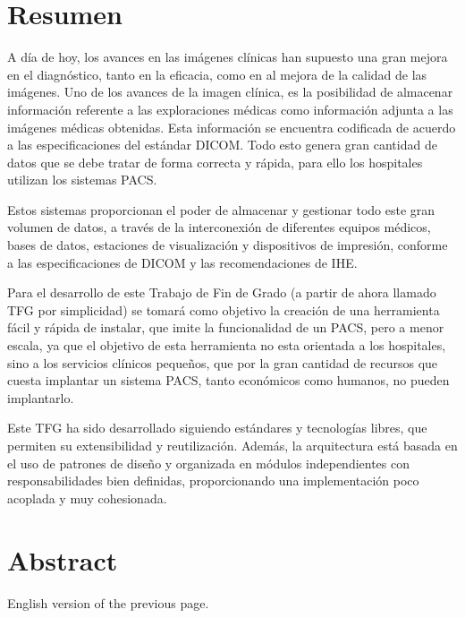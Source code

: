 \chapter{Resumen}

A día de hoy, los avances en las imágenes clínicas han supuesto una gran mejora en el diagnóstico, tanto en la eficacia, como en al mejora de la calidad de las imágenes. Uno de los avances de la imagen clínica, es la posibilidad de almacenar información referente a las exploraciones médicas como información adjunta a las imágenes médicas obtenidas. Esta información se encuentra codificada de acuerdo a las especificaciones del estándar DICOM. Todo esto genera gran cantidad de datos que se debe tratar de forma correcta y rápida, para ello los hospitales utilizan los sistemas PACS.

Estos sistemas proporcionan el poder de almacenar y gestionar todo este gran volumen de datos, a través de la interconexión de diferentes equipos médicos, bases de datos, estaciones de visualización y dispositivos de impresión, conforme a las especificaciones de DICOM y las recomendaciones de IHE. 

Para el desarrollo de este Trabajo de Fin de Grado (a partir de ahora llamado TFG por simplicidad) se tomará como objetivo la creación de una herramienta fácil y rápida de instalar, que imite la funcionalidad de un PACS, pero a menor escala, ya que el objetivo de esta herramienta no esta orientada a los hospitales, sino a los servicios clínicos pequeños, que por la gran cantidad de recursos que cuesta implantar un sistema PACS, tanto económicos como humanos, no pueden implantarlo.

Este TFG ha sido desarrollado siguiendo estándares y tecnologías libres, que permiten su extensibilidad y reutilización. Además, la arquitectura está basada en el uso de patrones de diseño y organizada en módulos independientes con responsabilidades bien definidas, proporcionando una implementación poco acoplada y muy cohesionada.


\chapter{Abstract}

English version of the previous page.
